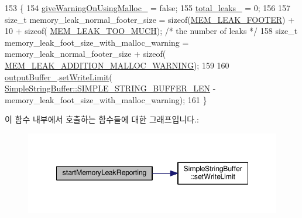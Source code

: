 \begin{DoxyCode}
153 \{
154     \hyperlink{class_memory_leak_output_string_buffer_a04fdc0c69ccd96059de5757ca5e45388}{giveWarningOnUsingMalloc\_} = \textcolor{keyword}{false};
155     \hyperlink{class_memory_leak_output_string_buffer_aba01adde02a49ff2d2334a1bc63d3efd}{total\_leaks\_} = 0;
156 
157     \textcolor{keywordtype}{size\_t} memory\_leak\_normal\_footer\_size = \textcolor{keyword}{sizeof}(\hyperlink{_memory_leak_detector_8cpp_ace72fade8aa1897ef04cb12166496a02}{MEM\_LEAK\_FOOTER}) + 10 + \textcolor{keyword}{sizeof}(
      \hyperlink{_memory_leak_detector_8cpp_a740c12f400ecb89a5ccc5cfa2bd6eb26}{MEM\_LEAK\_TOO\_MUCH}); \textcolor{comment}{/* the number of leaks */}
158     \textcolor{keywordtype}{size\_t} memory\_leak\_foot\_size\_with\_malloc\_warning = memory\_leak\_normal\_footer\_size + \textcolor{keyword}{sizeof}(
      \hyperlink{_memory_leak_detector_8cpp_af3a45c613922f0cc88e7441ee552a926}{MEM\_LEAK\_ADDITION\_MALLOC\_WARNING});
159 
160     \hyperlink{class_memory_leak_output_string_buffer_aba62884e35f3c42b627faf57b0e80a8c}{outputBuffer\_}.\hyperlink{struct_simple_string_buffer_abd59b77081323992830e4a3b9db501e6}{setWriteLimit}(
      \hyperlink{struct_simple_string_buffer_a4efaf4e07364d6302f598569aa7e55dca495824058d0344ce7789bfdfe6658843}{SimpleStringBuffer::SIMPLE\_STRING\_BUFFER\_LEN} - 
      memory\_leak\_foot\_size\_with\_malloc\_warning);
161 \}
\end{DoxyCode}


이 함수 내부에서 호출하는 함수들에 대한 그래프입니다.\+:
\nopagebreak
\begin{figure}[H]
\begin{center}
\leavevmode
\includegraphics[width=348pt]{class_memory_leak_output_string_buffer_a99cb7722b04d6e0539701d105c08af23_cgraph}
\end{center}
\end{figure}


